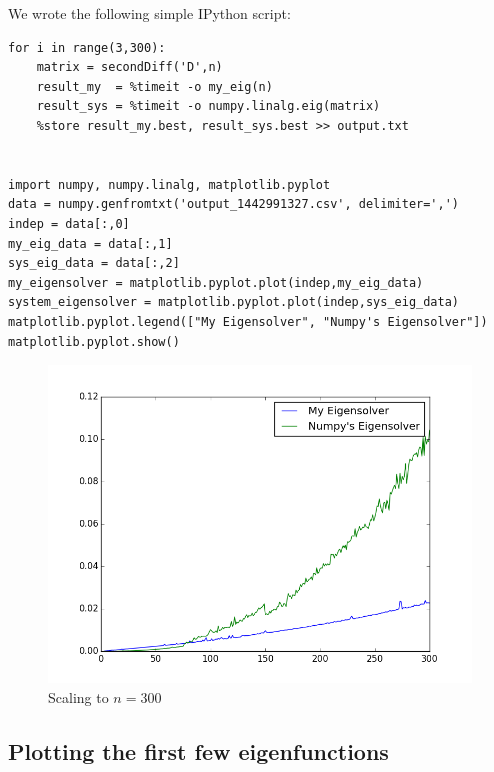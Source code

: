 \documentclass[12pt,]{book}
\begin{document}
We wrote the following simple IPython script:

\begin{verbatim}
for i in range(3,300):
    matrix = secondDiff('D',n)
    result_my  = %timeit -o my_eig(n)
    result_sys = %timeit -o numpy.linalg.eig(matrix)
    %store result_my.best, result_sys.best >> output.txt


import numpy, numpy.linalg, matplotlib.pyplot
data = numpy.genfromtxt('output_1442991327.csv', delimiter=',')
indep = data[:,0]
my_eig_data = data[:,1]
sys_eig_data = data[:,2]
my_eigensolver = matplotlib.pyplot.plot(indep,my_eig_data)
system_eigensolver = matplotlib.pyplot.plot(indep,sys_eig_data)
matplotlib.pyplot.legend(["My Eigensolver", "Numpy's Eigensolver"])
matplotlib.pyplot.show()
\end{verbatim}

\begin{figure}
\centering
\includegraphics[width=\textwidth]{graphics/figure_1.png}
\caption{Scaling to $n=300$}
\end{figure}

\vfill

\pagebreak

\subsection{Plotting the first few
eigenfunctions}\label{plotting-the-first-few-eigenfunctions}
\end{document}
